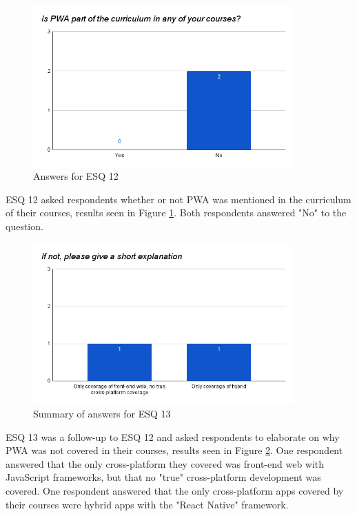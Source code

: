 \documentclass[a4paper,12pt]{article}
\begin{document}
\begin{figure}[ht!]
    \centering
    \includegraphics[width=10cm]{img/Results/esq12.png}
    \caption{Answers for ESQ 12}
    \label{fig:res_eduq12}
\end{figure}

ESQ 12 asked respondents whether or not PWA was mentioned in the curriculum of their courses, results seen in Figure \ref{fig:res_eduq12}. Both respondents answered "No" to the question.

\begin{figure}[ht!]
    \centering
    \includegraphics[width=10cm]{img/Results/esq13.png}
    \caption{Summary of answers for ESQ 13}
    \label{fig:res_eduq13}
\end{figure}

\newpage ESQ 13 was a follow-up to ESQ 12 and asked respondents to elaborate on why PWA was not covered in their courses, results seen in Figure \ref{fig:res_eduq13}. One respondent answered that the only cross-platform they covered was front-end web with JavaScript frameworks, but that no "true" cross-platform development was covered. One respondent answered that the only cross-platform apps covered by their courses were hybrid apps with the "React Native" framework.
\end{document}
